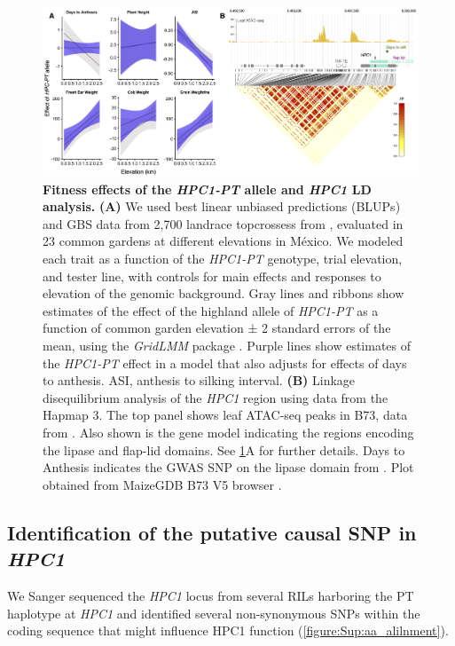 \documentclass[9pt,twocolumn,twoside,lineno]{biorxiv}
\newcommand{\hpc}{\textit{HPC1}\xspace}
\begin{document}
\begin{figure}[htp]
\centering
\includegraphics[width=0.8\paperwidth]{Figures/Fig_5.png}
\caption{\textbf{Fitness effects of the \textit{HPC1-PT} allele and \hpc LD analysis.} \textbf{(A)}
We used best linear unbiased predictions (BLUPs) and GBS data from 2,700 landrace topcrossess from \cite{Gates2019-xu}, evaluated in 23 common gardens at different elevations in M\'exico. 
We modeled each trait as a function of the \textit{HPC1-PT} genotype, trial elevation, and tester line, with controls for main effects and responses to elevation of the genomic background. 
Gray lines and ribbons show estimates of the effect of the highland allele of \textit{HPC1-PT} as a function of common garden elevation ± 2 standard errors of the mean, using the \textit{GridLMM} package \cite{Runcie2019-Gr}. 
Purple lines show estimates of the \textit{HPC1-PT} effect in a model that also adjusts for effects of days to anthesis. ASI, anthesis to silking interval. 
\textbf{(B)} Linkage disequilibrium analysis of the \hpc region using data from the Hapmap 3. 
The top panel shows leaf ATAC-seq peaks in B73, data from  \cite{Ricci2019-zj}.
Also shown is the  gene model indicating the regions encoding the lipase and flap-lid domains. 
See \ref{Fig5}A for further details.
Days to Anthesis indicates the GWAS SNP on the lipase domain from \cite{Wallace2014-yy}. 
Plot obtained from MaizeGDB B73 V5 browser \cite{Woodhouse2021-wd}.}
\label{Fig5}
\end{figure}
\subsection{Identification of the putative causal SNP in \hpc}
We Sanger sequenced the \hpc locus from several RILs harboring the PT haplotype at \hpc and identified several non-synonymous SNPs within the coding sequence that might influence HPC1 function (\cref{figure:Sup:aa_alilnment}).
\end{document}
